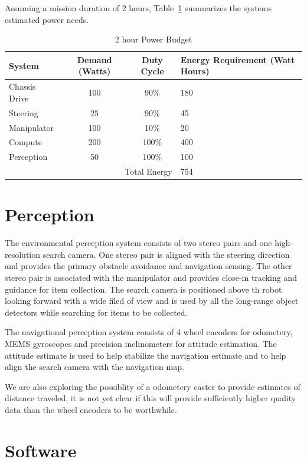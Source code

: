 \documentclass[12pt]{article}
\begin{document}
Assuming a mission duration of 2 hours, Table~\ref{power budget} summarizes the systems estimated power needs.

\begin{table}
    \caption{2 hour Power Budget}
    \label{power budget}
    \begin{tabular}{|l|c|c||p{4cm}|}
        \hline
        System & Demand (Watts) & Duty Cycle & Energy Requirement (Watt Hours)\\
        \hline
        Chassis Drive & 100 & 90\% & 180\\
        Steering & 25 & 90\% & 45\\
        Manipulator & 100 & 10\% & 20\\
        Compute & 200 & 100\% & 400\\
        Perception & 50 & 100\% & 100\\
        \hline
        \multicolumn{3}{|r||}{Total Energy} & 754\\
        \hline
    \end{tabular}
\end{table}

\section{Perception}\label{Perception}
The environmental perception system consists of two stereo pairs and one high-resolution search camera. One stereo pair is aligned with the steering direction and provides the primary obstacle avoidance and navigation sensing. The other stereo pair is associated with the manipulator and provides close-in tracking and guidance for item collection. The search camera is positioned above th robot looking forward with a wide filed of view and is used by all the long-range object detectors while searching for items to be collected.

The navigational perception system consists of 4 wheel encoders for odometery, MEMS gyroscopes and precision inclinometers for attitude estimation. The attitude estimate is used to help stabilize the navigation estimate and to help align the search camera with the navigation map.

We are also exploring the possiblity of a odometery caster to provide estimates of distance traveled, it is not yet clear if this will provide sufficiently higher quality data than the wheel encoders to be worthwhile.

\section{Software}\label{Software}
\end{document}

